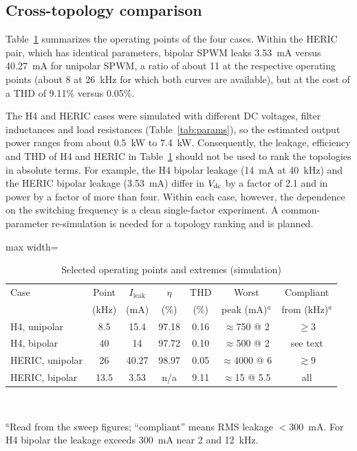 \subsection{Cross-topology comparison}
Table~\ref{tab:summary} summarizes the operating points of the four cases. Within the HERIC pair, which has identical parameters, bipolar SPWM leaks 3.53~mA versus 40.27~mA for unipolar SPWM, a ratio of about 11 at the respective operating points (about 8 at 26~kHz for which both curves are available), but at the cost of a THD of 9.11\% versus 0.05\%.

The H4 and HERIC cases were simulated with different DC voltages, filter inductances and load resistances (Table~\ref{tab:params}), so the estimated output power ranges from about 0.5~kW to 7.4~kW. Consequently, the leakage, efficiency and THD of H4 and HERIC in Table~\ref{tab:summary} should not be used to rank the topologies in absolute terms. For example, the H4 bipolar leakage (14~mA at 40~kHz) and the HERIC bipolar leakage (3.53~mA) differ in $V_{\mathrm{dc}}$ by a factor of 2.1 and in power by a factor of more than four. Within each case, however, the dependence on the switching frequency is a clean single-factor experiment. A common-parameter re-simulation is needed for a topology ranking and is planned.

\begin{table}[!t]
\renewcommand{\arraystretch}{1.2}
\caption{Selected operating points and extremes (simulation)}
\label{tab:summary}
\centering
\footnotesize
\setlength{\tabcolsep}{3.5pt}
\begin{adjustbox}{max width=\textwidth}
\begin{tabular}{lcccccc}
\toprule
Case & Point & $I_{\mathrm{leak}}$ & $\eta$ & THD & Worst & Compliant \\
 & (kHz) & (mA) & (\%) & (\%) & peak (mA)$^{a}$ & from (kHz)$^{a}$ \\
\midrule
H4, unipolar & 8.5 & 15.4 & 97.18 & 0.16 & $\approx$750 @ 2 & $\ge 3$ \\
H4, bipolar & 40 & 14 & 97.72 & 0.10 & $\approx$500 @ 2 & see text \\
HERIC, unipolar & 26 & 40.27 & 98.97 & 0.05 & $\approx$4000 @ 6 & $\gtrsim 9$ \\
HERIC, bipolar & 13.5 & 3.53 & n/a & 9.11 & $\approx$15 @ 5.5 & all \\
\bottomrule
\end{tabular}
\end{adjustbox}\\[2pt]
\begin{minipage}{0.97\textwidth}\footnotesize
$^{a}$Read from the sweep figures; ``compliant'' means RMS leakage $<300$~mA. For H4 bipolar the leakage exceeds 300~mA near 2 and 12~kHz.
\end{minipage}
\end{table}
